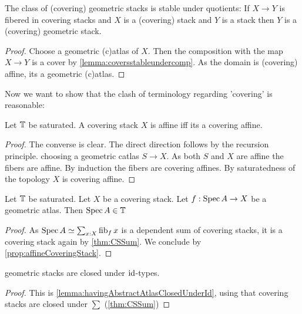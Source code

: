 \begin{prop}{\label{prop:stackQuot}}
	The class of (covering) geometric stacks is stable under quotients: If $X \to Y$ is fibered in covering stacks and $X$ is a (covering) stack and $Y$ is a stack then $Y$ is a (covering) geometric stack.
\end{prop}
\begin{proof}
	Choose a geometric (c)atlas of $X$. Then the composition with the map $X \to Y$ is a cover by \ref{lemma:coversstableundercomp}. As the domain is (covering) affine, its a geometric (c)atlas.
\end{proof}
Now we want to show that the clash of terminology regarding 'covering' is reasonable:


\begin{prop}{\label{prop:affineCoveringStack}}
	Let $\mathbb{T}$ be saturated.
	A covering stack $X$ is affine iff its a covering affine.
\end{prop}
\begin{proof}
	The converse is clear. The direct direction follows by the recursion principle. choosing a geometric catlas  $S \to X$. As both $S$ and $X$ are affine the fibers are affine. By induction the fibers are covering affines. By saturatedness of the topology $X$ is covering affine.
\end{proof}
\begin{lemma}{\label{lemma:atlasIsCatlas}}
	Let $\mathbb{T}$ be saturated. Let $X$ be a covering stack. Let $f : \operatorname{Spec} A \to X$ be a geometric atlas. Then $\operatorname{Spec} A \in \mathbb{T}$
\end{lemma}
\begin{proof}
	As $\operatorname{Spec} A \simeq \sum_{x : X} \operatorname{fib}_f x$ is a dependent sum of covering stacks, it is a covering stack again by \ref{thm:CSSum}. We conclude by \ref{prop:affineCoveringStack}.
\end{proof}	


\begin{lemma}{\label{lemma:geometricStacksClosedUnderId}}
	geometric stacks are closed under $\operatorname{id}$-types.
\end{lemma}
\begin{proof}
	
	This is \ref{lemma:havingAbstractAtlasClosedUnderId}, using that covering stacks are closed under $\sum$ (\ref{thm:CSSum})
\end{proof}

